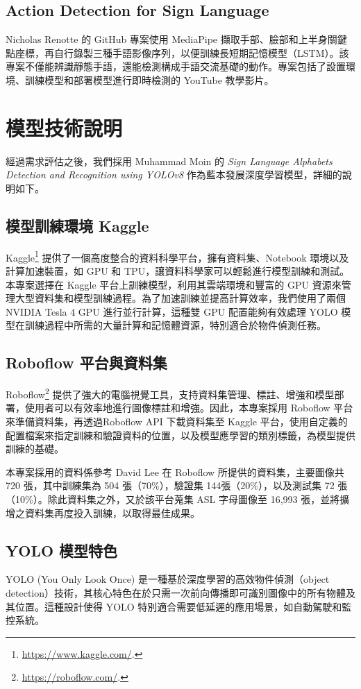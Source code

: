 \documentclass[conference]{IEEEtran}
\begin{document}
\subsection{Action Detection for Sign Language}
Nicholas Renotte 的 GitHub 專案使用 MediaPipe 擷取手部、臉部和上半身關鍵點座標，再自行錄製三種手語影像序列，以便訓練長短期記憶模型（LSTM）\cite{nicknochnack2024action}。該專案不僅能辨識靜態手語，還能檢測構成手語交流基礎的動作。專案包括了設置環境、訓練模型和部署模型進行即時檢測的 YouTube 教學影片。 

\section{模型技術說明}

經過需求評估之後，我們採用 Muhammad Moin 的 \textit{Sign Language Alphabets Detection and Recognition using YOLOv8} 作為藍本發展深度學習模型，詳細的說明如下。

\subsection{模型訓練環境 Kaggle}
Kaggle\footnote{\url{https://www.kaggle.com/}.} 提供了一個高度整合的資料科學平台，擁有資料集、Notebook 環境以及計算加速裝置，如 GPU 和 TPU，讓資料科學家可以輕鬆進行模型訓練和測試。本專案選擇在 Kaggle 平台上訓練模型，利用其雲端環境和豐富的 GPU 資源來管理大型資料集和模型訓練過程。為了加速訓練並提高計算效率，我們使用了兩個 NVIDIA Tesla 4 GPU 進行並行計算，這種雙 GPU 配置能夠有效處理 YOLO 模型在訓練過程中所需的大量計算和記憶體資源，特別適合於物件偵測任務。

\subsection{Roboflow 平台與資料集}
Roboflow\footnote{\url{https://roboflow.com/}.} 提供了強大的電腦視覺工具，支持資料集管理、標註、增強和模型部署，使用者可以有效率地進行圖像標註和增強。因此，本專案採用 Roboflow 平台來準備資料集，再透過Roboflow API 下載資料集至 Kaggle 平台，使用自定義的配置檔案來指定訓練和驗證資料的位置，以及模型應學習的類別標籤，為模型提供訓練的基礎。

本專案採用的資料係參考 David Lee\cite{davidlee2024asl} 在 Roboflow 所提供的資料集，主要圖像共 720 張，其中訓練集為 504 張（70\%），驗證集 144張（20\%），以及測試集 72 張（10\%）。除此資料集之外，又於該平台蒐集 ASL 字母圖像至 16,993 張，並將擴增之資料集再度投入訓練，以取得最佳成果。 

\subsection{YOLO 模型特色}
YOLO (You Only Look Once) 是一種基於深度學習的高效物件偵測（object detection）技術，其核心特色在於只需一次前向傳播即可識別圖像中的所有物體及其位置。這種設計使得 YOLO 特別適合需要低延遲的應用場景，如自動駕駛和監控系統。
\end{document}
